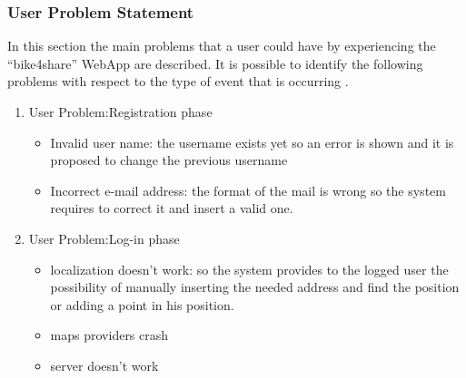 \documentclass{article}
\begin{document}
\subsubsection{User Problem Statement}
In this section the main problems that a user could have by experiencing the “bike4share” WebApp  are described.
It is possible to identify the following problems with respect to the type of event that is occurring .
\begin{enumerate}
    \item User Problem:Registration phase
        \begin{itemize}
            \item Invalid user name: the username exists yet so an error is shown and it is proposed to change the previous username
            \item  Incorrect e-mail address: the format of the mail is wrong so the system requires to correct it and insert a valid one.
    \end{itemize}
    \item User Problem:Log-in phase 
        \begin{itemize}
            \item localization doesn’t work: so the system provides to the logged user the possibility of  manually inserting the needed address and find the position or adding a point in his position.
            \item maps providers crash
            \item server doesn’t work
    \end{itemize}
\end{enumerate}
\end{document}
